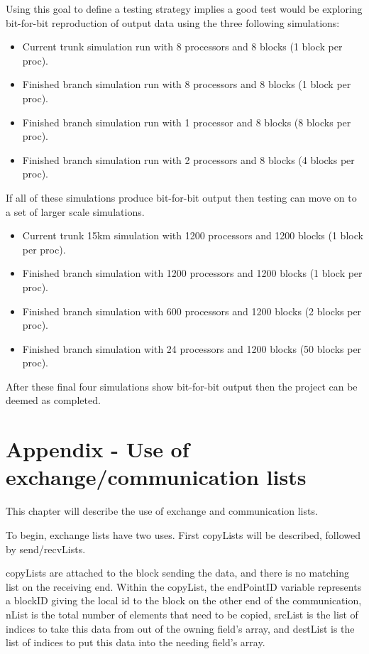\documentclass[11pt]{report}
\begin{document}
Using this goal to define a testing strategy implies a good test would be
exploring bit-for-bit reproduction of output data using the three following
simulations:
\begin{itemize}
	\item Current trunk simulation run with 8 processors and 8 blocks (1 block per proc).
	\item Finished branch simulation run with 8 processors and 8 blocks (1 block per proc).
	\item Finished branch simulation run with 1 processor and 8 blocks (8 blocks per proc).
	\item Finished branch simulation run with 2 processors and 8 blocks (4 blocks per proc).
\end{itemize}

If all of these simulations produce bit-for-bit output then testing can move on
to a set of larger scale simulations.

\begin{itemize}
	\item Current trunk 15km simulation with 1200 processors and 1200 blocks (1 block per proc).
	\item Finished branch simulation with 1200 processors and 1200 blocks (1 block per proc).
	\item Finished branch simulation with 600 processors and 1200 blocks (2 blocks per proc).
	\item Finished branch simulation with 24 processors and 1200 blocks (50 blocks per proc).
\end{itemize}

After these final four simulations show bit-for-bit output then the project can
be deemed as completed.

\chapter{Appendix - Use of exchange/communication lists}
This chapter will describe the use of exchange and communication lists.

To begin, exchange lists have two uses. First copyLists will be described,
followed by send/recvLists.

copyLists are attached to the block sending the data, and there is no matching
list on the receiving end. Within the copyList, the endPointID variable
represents a blockID giving the local id to the block on the other end of the
communication, nList is the total number of elements that need to be copied,
srcList is the list of indices to take this data from out of the owning field's
array, and destList is the list of indices to put this data into the needing
field's array. 
\end{document}
